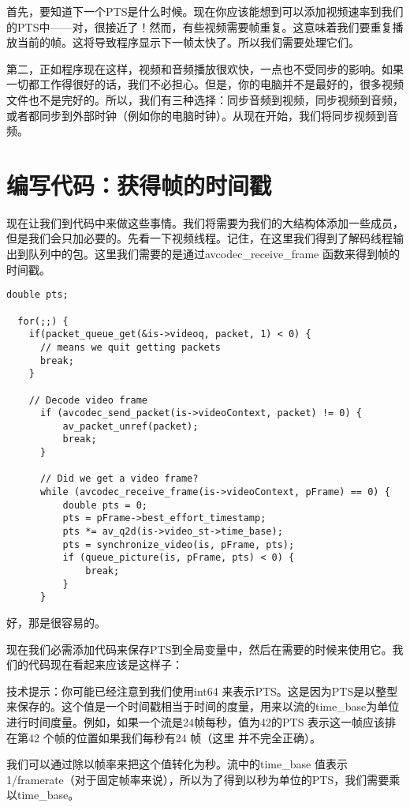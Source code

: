 首先，要知道下一个PTS是什么时候。现在你应该能想到可以添加视频速率到我们的PTS中——对，很接近了！然而，有些视频需要帧重复。这意味着我们要重复播放当前的帧。这将导致程序显示下一帧太快了。所以我们需要处理它们。

第二，正如程序现在这样，视频和音频播放很欢快，一点也不受同步的影响。如果一切都工作得很好的话，我们不必担心。但是，你的电脑并不是最好的，很多视频文件也不是完好的。所以，我们有三种选择：同步音频到视频，同步视频到音频，或者都同步到外部时钟（例如你的电脑时钟）。从现在开始，我们将同步视频到音频。

\section{编写代码：获得帧的时间戳}
现在让我们到代码中来做这些事情。我们将需要为我们的大结构体添加一些成员，但是我们会只加必要的。先看一下视频线程。记住，在这里我们得到了解码线程输出到队列中的包。这里我们需要的是通过avcodec_receive_frame 函数来得到帧的时间戳。

\begin{lstlisting}
double pts;

  for(;;) {
    if(packet_queue_get(&is->videoq, packet, 1) < 0) {
      // means we quit getting packets
      break;
    }

    // Decode video frame
      if (avcodec_send_packet(is->videoContext, packet) != 0) {
          av_packet_unref(packet);
          break;
      }

      // Did we get a video frame?
      while (avcodec_receive_frame(is->videoContext, pFrame) == 0) {
          double pts = 0;
          pts = pFrame->best_effort_timestamp;
          pts *= av_q2d(is->video_st->time_base);
          pts = synchronize_video(is, pFrame, pts);
          if (queue_picture(is, pFrame, pts) < 0) {
              break;
          }
      }
\end{lstlisting}

好，那是很容易的。

现在我们必需添加代码来保存PTS到全局变量中，然后在需要的时候来使用它。我们的代码现在看起来应该是这样子：

技术提示：你可能已经注意到我们使用int64 来表示PTS。这是因为PTS是以整型来保存的。这个值是一个时间戳相当于时间的度量，用来以流的time_base为单位进行时间度量。例如，如果一个流是24帧每秒，值为42的PTS 表示这一帧应该排在第42 个帧的位置如果我们每秒有24 帧（这里 并不完全正确）。

我们可以通过除以帧率来把这个值转化为秒。流中的time_base 值表示1/framerate（对于固定帧率来说），所以为了得到以秒为单位的PTS，我们需要乘以time_base。

